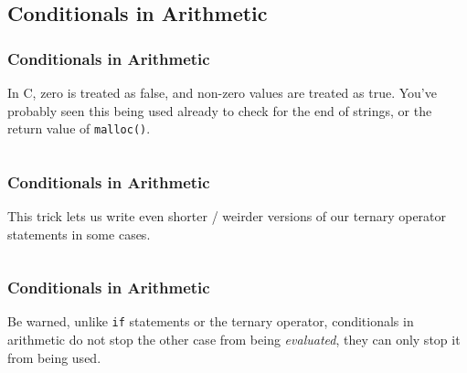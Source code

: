\documentclass[xcolor]{beamer}
\begin{document}
\subsection{Conditionals in Arithmetic}

\begin{frame}
	\frametitle{Conditionals in Arithmetic}
	\pause
	
	In C, zero is treated as false, and non-zero values are treated as true. You've probably seen this being used already to check for the end of strings, or the return value of \texttt{malloc()}.
	\pause
	
	\begin{columns}
		\begin{column}{0.45\textwidth}
			\centering
			
		\end{column}
		\pause
		\begin{column}{0.45\textwidth}
			\centering
			
		\end{column}
	\end{columns}
\end{frame}

\begin{frame}
	\frametitle{Conditionals in Arithmetic}
	\pause
	
	This trick lets us write even shorter / weirder versions of our ternary operator statements in some cases.
	\pause
	
	\begin{columns}
		\begin{column}{0.45\textwidth}
			\centering
			
		\end{column}
		\pause
		\begin{column}{0.45\textwidth}
			\centering
			
		\end{column}
	\end{columns}
\end{frame}

\begin{frame}
	\frametitle{Conditionals in Arithmetic}
	\pause
	
	Be warned, unlike \texttt{if} statements or the ternary operator, conditionals in arithmetic do not stop the other case from being \textit{evaluated}, they can only stop it from being used.
	\pause
	
	
\end{frame}
\end{document}
